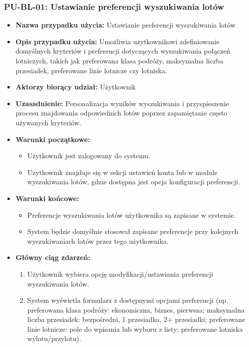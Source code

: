 \documentclass[a4paper,12pt]{article}
\begin{document}
\subsubsection{PU-BL-01: Ustawianie preferencji wyszukiwania lotów}
\begin{itemize}
    \item \textbf{Nazwa przypadku użycia:} Ustawianie preferencji wyszukiwania lotów
    \item \textbf{Opis przypadku użycia:} Umożliwia użytkownikowi zdefiniowanie domyślnych kryteriów i preferencji dotyczących wyszukiwania połączeń lotniczych, takich jak preferowana klasa podróży, maksymalna liczba przesiadek, preferowane linie lotnicze czy lotniska.
    \item \textbf{Aktorzy biorący udział:} Użytkownik
    \item \textbf{Uzasadnienie:} Personalizacja wyników wyszukiwania i przyspieszenie procesu znajdowania odpowiednich lotów poprzez zapamiętanie często używanych kryteriów.
    \item \textbf{Warunki początkowe:}
        \begin{itemize}
            \item Użytkownik jest zalogowany do systemu.
            \item Użytkownik znajduje się w sekcji ustawień konta lub w module wyszukiwania lotów, gdzie dostępna jest opcja konfiguracji preferencji.
        \end{itemize}
    \item \textbf{Warunki końcowe:}
        \begin{itemize}
            \item Preferencje wyszukiwania lotów użytkownika są zapisane w systemie.
            \item System będzie domyślnie stosował zapisane preferencje przy kolejnych wyszukiwaniach lotów przez tego użytkownika.
        \end{itemize}
    \item \textbf{Główny ciąg zdarzeń:}
        \begin{enumerate}
            \item Użytkownik wybiera opcję modyfikacji/ustawiania preferencji wyszukiwania lotów.
            \item System wyświetla formularz z dostępnymi opcjami preferencji (np. preferowana klasa podróży: ekonomiczna, biznes, pierwsza; maksymalna liczba przesiadek: bezpośredni, 1 przesiadka, 2+ przesiadki; preferowane linie lotnicze: pole do wpisania lub wyboru z listy; preferowane lotniska wylotu/przylotu).

\end{enumerate}
\end{itemize}
\end{document}
